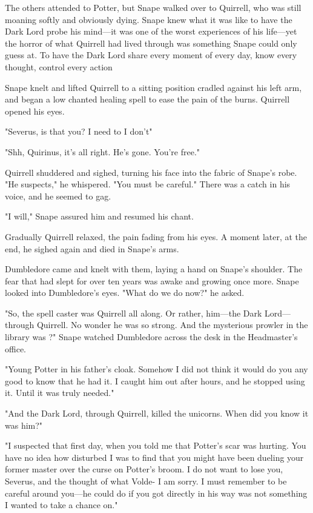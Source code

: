 The others attended to Potter, but Snape walked over to Quirrell, who was still moaning softly and obviously dying. Snape knew what it was like to have the Dark Lord probe his mind—it was one of the worst experiences of his life—yet the horror of what Quirrell had lived through was something Snape could only guess at. To have the Dark Lord share every moment of every day, know every thought, control every action{\el}

Snape knelt and lifted Quirrell to a sitting position cradled against his left arm, and began a low chanted healing spell to ease the pain of the burns. Quirrell opened his eyes.

"Severus, is that you? I need to{\el} I don't{\el}"

"Shh, Quirinus, it's all right. He's gone. You're free."

Quirrell shuddered and sighed, turning his face into the fabric of Snape's robe. "He suspects," he whispered. "You must be careful." There was a catch in his voice, and he seemed to gag.

"I will," Snape assured him and resumed his chant.

Gradually Quirrell relaxed, the pain fading from his eyes. A moment later, at the end, he sighed again and died in Snape's arms.

Dumbledore came and knelt with them, laying a hand on Snape's shoulder. The fear that had slept for over ten years was awake and growing once more. Snape looked into Dumbledore's eyes. "What do we do now?" he asked.

\sbreak

"So, the spell caster was Quirrell all along. Or rather, him—the Dark Lord—through Quirrell. No wonder he was so strong. And the mysterious prowler in the library was{\el} ?" Snape watched Dumbledore across the desk in the Headmaster's office.

"Young Potter in his father's cloak. Somehow I did not think it would do you any good to know that he had it. I caught him out after hours, and he stopped using it. Until it was truly needed."

"And the Dark Lord, through Quirrell, killed the unicorns. When did you know it was him?"

"I suspected that first day, when you told me that Potter's scar was hurting. You have no idea how disturbed I was to find that you might have been dueling your former master over the curse on Potter's broom. I do not want to lose you, Severus, and the thought of what Volde-{\el} I am sorry. I must remember to be careful around you{\el}—he could do if you got directly in his way was not something I wanted to take a chance on."

